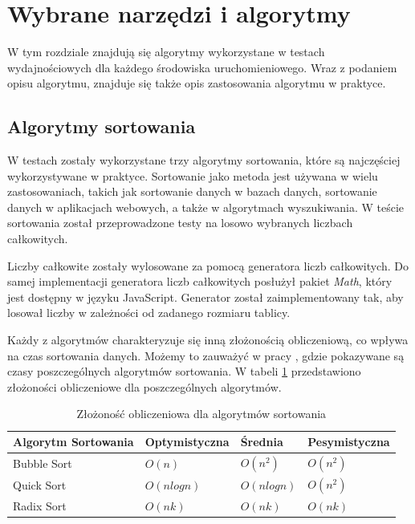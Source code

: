 \section{Wybrane narzędzi i algorytmy}
W tym rozdziale znajdują się algorytmy wykorzystane w testach wydajnościowych dla każdego środowiska uruchomieniowego. Wraz z podaniem opisu algorytmu, znajduje się także opis zastosowania algorytmu w praktyce.

\subsection{Algorytmy sortowania}
W testach zostały wykorzystane trzy algorytmy sortowania, które są najczęściej wykorzystywane w praktyce. Sortowanie jako metoda jest używana w wielu zastosowaniach, takich jak sortowanie danych w bazach danych, sortowanie danych w aplikacjach webowych, a także w algorytmach wyszukiwania. W teście sortowania został przeprowadzone testy na losowo wybranych liczbach całkowitych.

Liczby całkowite zostały wylosowane za pomocą generatora liczb całkowitych. Do samej implementacji generatora liczb całkowitych posłużył pakiet \textit{Math}, który jest dostępny w języku JavaScript. Generator został zaimplementowany tak, aby losował liczby w zależności od zadanego rozmiaru tablicy.

Każdy z algorytmów charakteryzuje się inną złożonością obliczeniową, co wpływa na czas sortowania danych. Możemy to zauważyć w pracy \cite{sorting}, gdzie pokazywane są czasy poszczególnych algorytmów sortowania. W tabeli \ref{tab:sorting_complexity} przedstawiono złożoności obliczeniowe dla poszczególnych algorytmów.

\begin{table}[h]
  \centering
  \begin{tabular}{|l|l|l|l|}
  \hline
  \textbf{Algorytm Sortowania} & \textbf{Optymistyczna} & \textbf{Średnia} & \textbf{Pesymistyczna} \\ \hline
    Bubble Sort & $O(n)$ & $O(n^2)$ & $O(n^2)$ \\ 
    \hline
    Quick Sort & $O(n log n)$ & $O(n log n)$ & $O(n^2)$ \\ 
    \hline
    Radix Sort & $O(nk)$ & $O(nk)$ & $O(nk)$ \\
    \hline
  \end{tabular}
  \caption{Złożoność obliczeniowa dla algorytmów sortowania}
  \label{tab:sorting_complexity}
\end{table}

